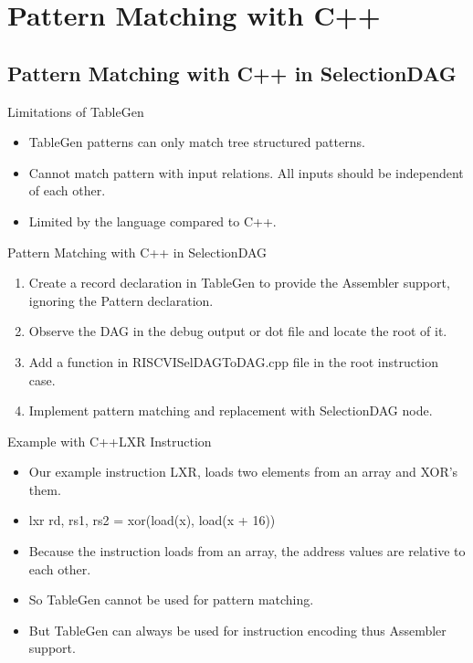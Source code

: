 
\section{Pattern Matching with C++}

\subsection{Pattern Matching with C++ in SelectionDAG}
\begin{frame}[fragile]{Limitations of TableGen}
\begin{itemize}
    \item TableGen patterns can only match tree structured patterns.
    \item Cannot match pattern with input relations. All inputs should be independent of each other.
    \item Limited by the language compared to C++.
\end{itemize}


\end{frame}

\begin{frame}{Pattern Matching with C++ in SelectionDAG}
\begin{enumerate}
    \item Create a record declaration in TableGen to provide the Assembler support, ignoring the Pattern declaration.
    \item Observe the DAG in the debug output or dot file and locate the root of it. 
    \item Add a function in RISCVISelDAGToDAG.cpp file in the root instruction case. 
    \item Implement pattern matching and replacement with SelectionDAG node.
\end{enumerate}
\end{frame}

\begin{frame}{Example with C++}{LXR Instruction}
\begin{itemize}
    \item Our example instruction LXR, loads two elements from an array and XOR's them.
    \item lxr rd, rs1, rs2 = xor(load(x), load(x + 16))

    \item Because the instruction loads from an array, the address values are relative to each other. 
    \item So TableGen cannot be used for pattern matching.
    \item But TableGen can always be used for instruction encoding thus Assembler support.
\end{itemize}
\end{frame}

